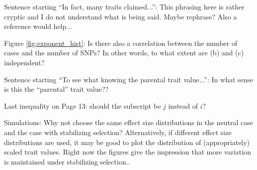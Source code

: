 
\begin{point}{\revref}
    Sentence starting ``In fact, many traits claimed...'': This phrasing here is rather cryptic and I do not understand what is being said. Maybe rephrase? Also a reference would help...
\end{point}


\begin{point}{}
    Figure \ref{fig:exponent_hist}: Is there also a correlation between the number of cases and the number of SNPs? In other words, to what extent are (b) and (c) independent?
\end{point}


\begin{point}{\revref}
    Sentence starting ``To see what knowing the parental trait value...'': In what sense is this the ``parental'' trait value??
\end{point}

\reply{
}

\begin{point}{\revref}
    Last inequality on Page 13: should the subscript be $j$ instead of $i$?
\end{point}


\begin{point}{}
    Simulations: Why not choose the same effect size distributions in the neutral case and the case with stabilizing selection? Alternatively, if different effect size distributions are used, it may be good to plot the distribution of (appropriately) scaled trait values. Right now the figures give the impression that more variation is maintained under stabilizing selection..
\end{point}


